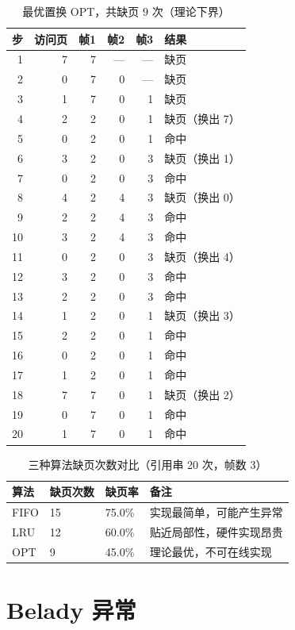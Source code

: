 \begin{table}[H]
\centering
\caption{最优置换 OPT，共缺页 $9$ 次（理论下界）}
\begin{tabular}{rrrrrl}
\toprule
步 & 访问页 & 帧1 & 帧2 & 帧3 & 结果 \\
\midrule
 1 & 7 & 7 & — & — & 缺页 \\
 2 & 0 & 7 & 0 & — & 缺页 \\
 3 & 1 & 7 & 0 & 1 & 缺页 \\
 4 & 2 & 2 & 0 & 1 & 缺页（换出 7） \\
 5 & 0 & 2 & 0 & 1 & 命中 \\
 6 & 3 & 2 & 0 & 3 & 缺页（换出 1） \\
 7 & 0 & 2 & 0 & 3 & 命中 \\
 8 & 4 & 2 & 4 & 3 & 缺页（换出 0） \\
 9 & 2 & 2 & 4 & 3 & 命中 \\
10 & 3 & 2 & 4 & 3 & 命中 \\
11 & 0 & 2 & 0 & 3 & 缺页（换出 4） \\
12 & 3 & 2 & 0 & 3 & 命中 \\
13 & 2 & 2 & 0 & 3 & 命中 \\
14 & 1 & 2 & 0 & 1 & 缺页（换出 3） \\
15 & 2 & 2 & 0 & 1 & 命中 \\
16 & 0 & 2 & 0 & 1 & 命中 \\
17 & 1 & 2 & 0 & 1 & 命中 \\
18 & 7 & 7 & 0 & 1 & 缺页（换出 2） \\
19 & 0 & 7 & 0 & 1 & 命中 \\
20 & 1 & 7 & 0 & 1 & 命中 \\
\bottomrule
\end{tabular}
\end{table}

\begin{table}[H]
\centering
\caption{三种算法缺页次数对比（引用串 20 次，帧数 3）}
\begin{tabulary}{\textwidth}{LLLL}
\toprule
算法 & 缺页次数 & 缺页率 & 备注 \\
\midrule
FIFO & 15 & 75.0\% & 实现最简单，可能产生异常 \\
LRU  & 12 & 60.0\% & 贴近局部性，硬件实现昂贵 \\
OPT  & 9  & 45.0\% & 理论最优，不可在线实现 \\
\bottomrule
\end{tabulary}
\end{table}

\section{Belady 异常}

